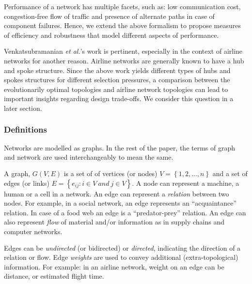 \documentclass[10pt]{article}
\begin{document}
Performance of a network has multiple facets, such as: low communication cost, congestion-free flow of traffic and presence of alternate paths in case of component failures. Hence, we extend the above formalism to propose measures of efficiency and robustness that model different aspects of performance. 

Venkatsubramanian \textit{et al.}'s work is pertinent, especially in the context of airline networks for another reason. Airline networks are generally known to have a hub and spoke structure. Since the above work yields different types of hubs and spokes structures for different selection pressures, a comparison between the evolutionarily optimal topologies and airline network topologies can lead to important insights regarding design trade-offs. We consider this question in a later section.%


\subsubsection{Definitions}

Networks are modelled as graphs. In the rest of the paper, the terms of graph and network are used interchangeably to mean the same.

A graph, $G(V, E)$ is a set of of vertices (or nodes) $V = \left\{1, 2, ..., n\right\}$ and a set of edges (or links) $E = \left\{e_{ij}: i \in V\ and\ j \in V\right\}$. A node can represent a machine, a human or a cell in a network. An edge can represent a \textit{relation} between two nodes. For example, in a social network, an edge represents an ``acquaintance'' relation. In case of a food web an edge is a ``predator-prey'' relation. An edge can also represent \textit{flow} of material and/or information as in supply chains and computer networks.

Edges can be \textit{undirected} (or bidirected) or \textit{directed}, indicating the direction of a relation or flow. Edge \textit{weights} are used to convey additional (extra-topological) information. For example: in an airline network, weight on an edge can be distance, or estimated flight time.
\end{document}
